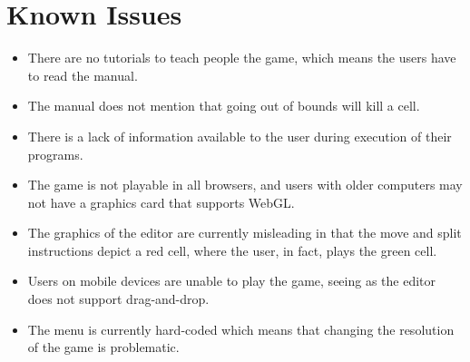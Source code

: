 \section{Known Issues}
\label{sec:known_issues}

\begin{itemize}
\item There are no tutorials to teach people the game, which means the users have to read the manual.
\item The manual does not mention that going out of bounds will kill a cell.
\item There is a lack of information available to the user during execution of their programs.
\item The game is not playable in all browsers, and users with older computers may not have a graphics card that supports WebGL.
\item The graphics of the editor are currently misleading in that the move and split instructions depict a red cell, where the user, in fact, plays the green cell.
\item Users on mobile devices are unable to play the game, seeing as the editor does not support drag-and-drop.
\item The menu is currently hard-coded which means that changing the resolution of the game is problematic.
\end{itemize}